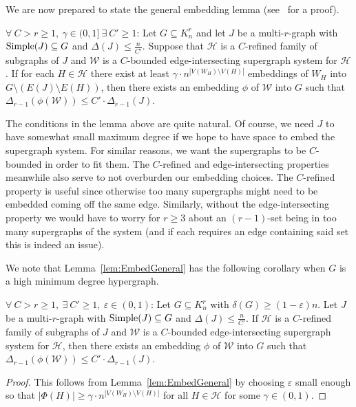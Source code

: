 \documentclass[twoside,leqno]{article}
\begin{document}
We are now prepared to state the general embedding lemma (see~\cite{DHLP25} for a proof). 

\begin{lemma}\label{lem:EmbedGeneral}
$\forall~C > r \ge 1,~\gamma\in (0,1]~\exists~C'\ge 1$: Let $G\subseteq K_n^r$ and let $J$ be a multi-$r$-graph with ${\rm Simple}(J)\subseteq G$ and $\Delta(J)\le \frac{n}{C'}$. Suppose that $\mathcal{H}$ is a $C$-refined family of subgraphs of $J$ and $\mathcal{W}$ is a $C$-bounded edge-intersecting supergraph system for $\mathcal{H}$. If for each $H\in \mathcal{H}$ there exist at least $\gamma\cdot n^{|V(W_H)\setminus V(H)|}$ embeddings of $W_H$ into $G\setminus (E(J)\setminus E(H))$,
then there exists an embedding $\phi$ of $\mathcal{W}$ into $G$ such that $\Delta_{r-1}(\phi(\mathcal{W})) \le C'\cdot \Delta_{r-1}(J)$.
\end{lemma}

The conditions in the lemma above are quite natural. Of course, we need $J$ to have somewhat small maximum degree if we hope to have space to embed the supergraph system. For similar reasons, we want the supergraphs to be $C$-bounded in order to fit them. The $C$-refined and edge-intersecting properties meanwhile also serve to not overburden our embedding choices. The $C$-refined property is useful since otherwise too many supergraphs might need to be embedded coming off the same edge. Similarly, without the edge-intersecting property we would have to worry for $r\ge 3$ about an $(r-1)$-set being in too many supergraphs of the system (and if each requires an edge containing said set this is indeed an issue).

We note that Lemma~\ref{lem:EmbedGeneral} has the following corollary when $G$ is a high minimum degree hypergraph.

\begin{lemma}[Embedding]\label{lem:EmbedMinDegree}
$\forall~C > r \ge 1,~\exists~C'\ge 1,~\varepsilon\in (0,1)$: Let $G\subseteq K_n^r$ with $\delta(G)\ge (1-\varepsilon)n$. Let $J$ be a multi-$r$-graph with ${\rm Simple}(J)\subseteq G$ and $\Delta(J)\le \frac{n}{C'}$. If $\mathcal{H}$ is a $C$-refined family of subgraphs of $J$ and $\mathcal{W}$ is a $C$-bounded edge-intersecting supergraph system for $\mathcal{H}$, then there exists an embedding $\phi$ of $\mathcal{W}$ into $G$ such that $\Delta_{r-1}(\phi(\mathcal{W})) \le C'\cdot \Delta_{r-1}(J)$.
\end{lemma}
\begin{proof}
This follows from Lemma~\ref{lem:EmbedGeneral} by choosing $\varepsilon$ small enough so that $|\Phi(H)|\ge \gamma \cdot n^{|V(W_H)\setminus V(H)|}$ for all $H\in \mathcal{H}$ for some $\gamma\in (0,1)$.
\end{proof}
 
\end{document}
